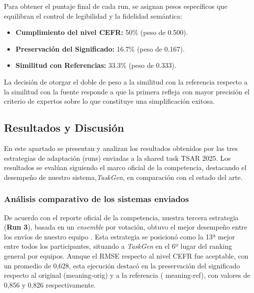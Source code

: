 Para obtener el puntaje final de cada run, se asignan pesos específicos que equilibran el control de legibilidad y la fidelidad semántica:
\begin{itemize}
    \item \textbf{Cumplimiento del nivel CEFR:} 50\% (peso de 0.500).
    \item \textbf{Preservación del Significado:} 16.7\% (peso de 0.167).
    \item \textbf{Similitud con Referencias:} 33.3\% (peso de 0.333).
\end{itemize}

La decisión de otorgar el doble de peso a la similitud con la referencia respecto a la similitud con la fuente responde a que la primera refleja con mayor precisión el criterio de expertos sobre lo que constituye una simplificación exitosa.



\subsection{Resultados y Discusión}\label{sec:ad_resultados}

En este apartado se presentan y analizan los resultados obtenidos por las tres estrategias de adaptación (runs) enviadas a la shared task TSAR 2025. Los resultados se evalúan siguiendo el marco oficial de la competencia, destacando el desempeño de nuestro sistema,\textit{TaskGen}, en comparación con el estado del arte.

\subsubsection*{Análisis comparativo de los sistemas enviados}

De acuerdo con el reporte oficial de la competencia, nuestra tercera estrategia (\textbf{Run 3}), basada en un \textit{ensemble} por votación, obtuvo el mejor desempeño entre los envíos de nuestro equipo \parencite{Oviedo2025}. Esta estrategia se posicionó como la 13ª mejor entre todos los participantes, situando a \textit{TaskGen} en el 6º lugar del ranking general por equipos. Aunque el RMSE respecto al nivel CEFR fue aceptable, con un promedio de 0,628, esta ejecución destacó en la preservación del significado respecto al original (meaning-orig) y a la referencia ( meaning-ref), con valores de 0,856 y 0,826 respectivamente.


